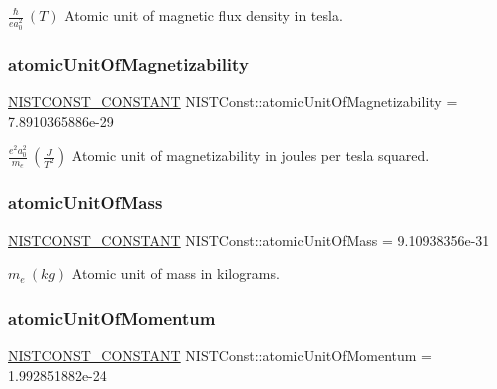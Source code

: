 $\frac{\hbar}{e a_0^2} \ (T)$ Atomic unit of magnetic flux density in tesla. \mbox{\label{group___n_i_s_t_const-_atomic_unit_ga20e7e2a56b476e5730ce9c59a4efc946}} 
\subsubsection{\texorpdfstring{atomic\+Unit\+Of\+Magnetizability}{atomicUnitOfMagnetizability}}
{\footnotesize\ttfamily \mbox{\hyperlink{_n_i_s_t_const_8hpp_a2b0fc1d7452373f816175dd86ce26729}{N\+I\+S\+T\+C\+O\+N\+S\+T\+\_\+\+C\+O\+N\+S\+T\+A\+NT}} N\+I\+S\+T\+Const\+::atomic\+Unit\+Of\+Magnetizability = 7.\+8910365886e-\/29}

$\frac{e^2a_0^2}{m_e} \ (\frac{J}{T^2})$ Atomic unit of magnetizability in joules per tesla squared. \mbox{\label{group___n_i_s_t_const-_atomic_unit_gaffbb7b29a9d92b540321f074f46903ae}} 
\subsubsection{\texorpdfstring{atomic\+Unit\+Of\+Mass}{atomicUnitOfMass}}
{\footnotesize\ttfamily \mbox{\hyperlink{_n_i_s_t_const_8hpp_a2b0fc1d7452373f816175dd86ce26729}{N\+I\+S\+T\+C\+O\+N\+S\+T\+\_\+\+C\+O\+N\+S\+T\+A\+NT}} N\+I\+S\+T\+Const\+::atomic\+Unit\+Of\+Mass = 9.\+10938356e-\/31}

$m_e \ (kg)$ Atomic unit of mass in kilograms. \mbox{\label{group___n_i_s_t_const-_atomic_unit_ga3a2d8ad829da0868381d6f31817ed453}} 
\subsubsection{\texorpdfstring{atomic\+Unit\+Of\+Momentum}{atomicUnitOfMomentum}}
{\footnotesize\ttfamily \mbox{\hyperlink{_n_i_s_t_const_8hpp_a2b0fc1d7452373f816175dd86ce26729}{N\+I\+S\+T\+C\+O\+N\+S\+T\+\_\+\+C\+O\+N\+S\+T\+A\+NT}} N\+I\+S\+T\+Const\+::atomic\+Unit\+Of\+Momentum = 1.\+992851882e-\/24}

